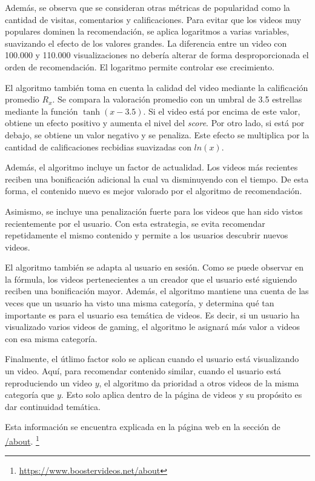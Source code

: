 Además, se observa que se consideran otras métricas de popularidad como la cantidad de visitas, comentarios y calificaciones. Para evitar que los videos muy populares dominen la recomendación, se aplica logaritmos a varias variables, suavizando el efecto de los valores grandes. La diferencia entre un video con 100.000 y 110.000 visualizaciones no debería alterar de forma desproporcionada el orden de recomendación. El logaritmo permite controlar ese crecimiento.

El algoritmo también toma en cuenta la calidad del video mediante la calificación promedio $R_x$. Se compara la valoración promedio con un umbral de 3.5 estrellas mediante la función $\tanh(x - 3.5)$. Si el video está por encima de este valor, obtiene un efecto positivo y aumenta el nivel del \textit{score}. Por otro lado, si está por debajo, se obtiene un valor negativo y se penaliza. Este efecto se multiplica por la cantidad de calificaciones recbidias suavizadas con $ln(x)$. 

Además, el algoritmo incluye un factor de actualidad. Los videos más recientes reciben una bonificación adicional la cual va disminuyendo con el tiempo. De esta forma, el contenido nuevo es mejor valorado por el algoritmo de recomendación. 

Asimismo, se incluye una penalización fuerte para los videos que han sido vistos recientemente por el usuario. Con esta estrategia, se evita recomendar repetidamente el mismo contenido y permite a los usuarios descubrir nuevos videos. 

El algoritmo también se adapta al usuario en sesión. Como se puede observar en la fórmula, los videos pertenecientes a un creador que el usuario esté siguiendo reciben una bonificación mayor. Además, el algoritmo mantiene una cuenta de las veces que un usuario ha visto una misma categoría, y determina qué tan importante es para el usuario esa temática de videos. Es decir, si un usuario ha visualizado varios videos de gaming, el algoritmo le asignará más valor a videos con esa misma categoría. 

Finalmente, el útlimo factor solo se aplican cuando el usuario está visualizando un video. Aquí, para recomendar contenido similar, cuando el usuario está reproduciendo un video $y$, el algoritmo da prioridad a otros videos de la misma categoría que $y$. Esto solo aplica dentro de la página de videos y su propósito es dar continuidad temática. 

Esta información se encuentra explicada en la página web en la sección de \href{https://www.boostervideos.net/about}{/about}. \footnote{\url{https://www.boostervideos.net/about}}


